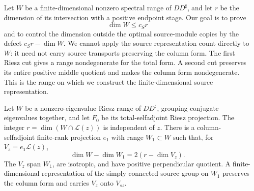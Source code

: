 Let $W$ be a finite-dimensional nonzero spectral range of $DD^\sharp$,
and let $r$ be the dimension of its intersection with a positive endpoint
stage.  Our goal is to prove
\[
 \dim W\leq c_Sr
\]
and to control the dimension outside the optimal source-module copies by
the defect $c_Sr-\dim W$.  We cannot apply the source representation count
directly to $W$: it need not carry source transports preserving the column
form.  The first Riesz cut gives a range nondegenerate for the total form.
A second cut preserves its entire positive middle quotient and makes the
column form nondegenerate.  This is the range on which we construct the
finite-dimensional source representation.

\begin{lemma}\label{lem:panels-riesz}
Let $W$ be a nonzero-eigenvalue Riesz range of $DD^\sharp$, grouping
conjugate eigenvalues together, and let $F_0$ be its total-selfadjoint
Riesz projection.  The integer
$r=\dim(W\cap\mathcal L(z))$ is independent of $z$.  There is a
column-selfadjoint finite-rank projection $e_1$ with range $W_1\subset
W$ such that, for $V_z=e_1\mathcal L(z)$,
\begin{equation}\label{eq:panels-riesz-dimension}
 \dim W-\dim W_1=2(r-\dim V_z).
\end{equation}
The $V_z$ span $W_1$, are isotropic, and have positive perpendicular
quotient.  A finite-dimensional representation of the simply connected
source group on $W_1$ preserves the column form and carries $V_z$ onto
$V_{sz}$.
\end{lemma}

